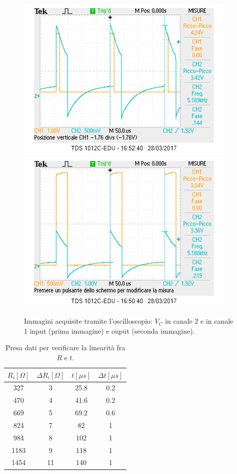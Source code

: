 \documentclass[10pt,a4paper]{article}
\begin{document}
\begin{figure}[!htb]
  \centering
  \includegraphics[scale=0.75]{1in2c.png}\includegraphics[scale=0.75]{1out2c}
\caption{Immagini acquisite tramite l'oscilloscopio: $V_C$ in canale 2 e in canale 1 input (prima immagine) e ouput (seconda immagine).\label{osc:monostabile}}
\end{figure}

\begin{table}[!htb]
\centering
\begin{tabular}{|c|c|c|c|}
\hline 
$R_i [\Omega ]$ & $\Delta R_i [\Omega ]$ & $t [\mu s]$ & $\Delta t [\mu s]$\\
\hline
 327 &  3 & 25.8 & 0.2\\ 
\hline 
 470 &  4 & 41.6 & 0.2\\ 
\hline
 669 &  5 & 69.2 & 0.6\\ 
\hline
 824 &  7 & 82 & 1\\ 
\hline 
 984 &  8 & 102 & 1\\ 
\hline
 1183 &  9 & 118 & 1\\ 
\hline
 1454 &  11 & 140 & 1\\ 
\hline
\end{tabular} 
\caption{Presa dati per verificare la linearità fra $R$ e $t$.\label{tab:monostabile}}
\end{table}
\end{document}
